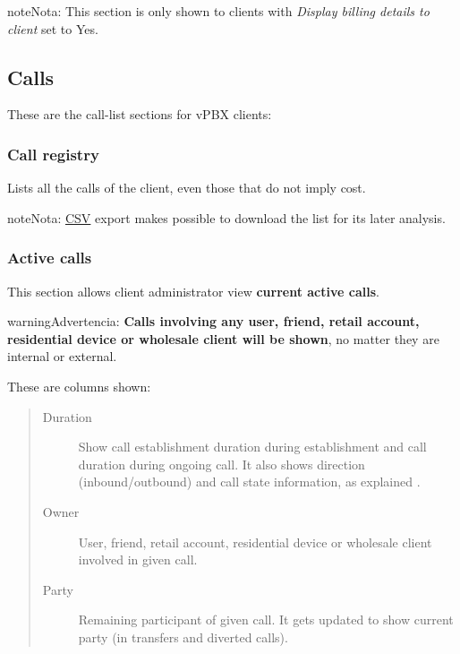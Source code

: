 \documentclass[letterpaper,10pt,spanish]{sphinxmanual}
\begin{document}
\begin{notice}{note}{Nota:}
This section is only shown to clients with \emph{Display billing details to client} set to Yes.
\end{notice}


\subsection{Calls}
\label{administration_portal/client/vpbx/calls/index::doc}\label{administration_portal/client/vpbx/calls/index:calls}
These are the call-list sections for vPBX clients:


\subsubsection{Call registry}
\label{administration_portal/client/vpbx/calls/call_registry::doc}\label{administration_portal/client/vpbx/calls/call_registry:call-registry}\label{administration_portal/client/vpbx/calls/call_registry:id1}
Lists all the calls of the client, even those that do not imply cost.

\begin{notice}{note}{Nota:}
\href{https://es.wikipedia.org/wiki/CSV}{CSV} export makes possible to
download the list for its later analysis.
\end{notice}


\subsubsection{Active calls}
\label{administration_portal/client/vpbx/calls/active_calls::doc}\label{administration_portal/client/vpbx/calls/active_calls:active-calls}
This section allows client administrator view \textbf{current active calls}.

\begin{notice}{warning}{Advertencia:}
\textbf{Calls involving any user, friend, retail account, residential device or wholesale client will be shown},
no matter they are internal or external.
\end{notice}

These are columns shown:
\begin{quote}
\begin{description}
\item[{Duration}] \leavevmode
Show call establishment duration during establishment and call duration during ongoing call. It also shows
direction (inbound/outbound) and call state information, as explained {\hyperref[administration_portal/platform/active_calls:call\string-state]{}}.

\item[{Owner}] \leavevmode
User, friend, retail account, residential device or wholesale client involved in given call.

\item[{Party}] \leavevmode
Remaining participant of given call. It gets updated to show current party (in transfers and diverted calls).

\end{description}
\end{quote}
\end{document}
